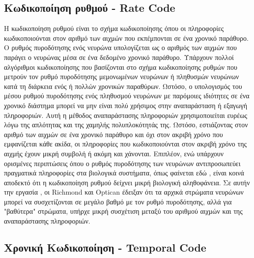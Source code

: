 \documentclass[12pt]{report}
\begin{document}
\subsection{Κωδικοποίηση ρυθμού - \textlatin{Rate Code}}

Η κωδικοποίηση ρυθμού είναι το σχήμα κωδικοποίησης όπου οι πληροφορίες κωδικοποιούνται στον αριθμό των αιχμών που εκπέμπονται σε ένα χρονικό παράθυρο. Ο ρυθμός πυροδότησης ενός νευρώνα υπολογίζεται ως ο αριθμός των αιχμών που παράγει ο νευρώνας μέσα σε ένα δεδομένο χρονικό παράθυρο. Υπάρχουν πολλοί αλγόριθμοι κωδικοποίησης που βασίζονται στο σχήμα κωδικοποίησης ρυθμών που μετρούν τον ρυθμό πυροδότησης μεμονωμένων νευρώνων ή πληθυσμών νευρώνων κατά τη διάρκεια ενός ή πολλών χρονικών παραθύρων. Ωστόσο, ο υπολογισμός του μέσου ρυθμού πυροδότησης ενός πληθυσμού νευρώνων με παρόμοιες ιδιότητες σε ένα χρονικό διάστημα μπορεί να μην είναι πολύ χρήσιμος στην αναπαράσταση ή εξαγωγή πληροφοριών. Αυτή η μέθοδος αναπαράστασης πληροφοριών χρησιμοποιείται ευρέως λόγω της απλότητας και της χαμηλής πολυπλοκότητάς της. Ωστόσο, εστιάζοντας στον αριθμό των αιχμών σε ένα χρονικό παράθυρο και όχι στον ακριβή χρόνο που εμφανίζεται κάθε ακίδα, οι πληροφορίες που κωδικοποιούνται στον ακριβή χρόνο της αιχμής έχουν μικρή συμβολή ή ακόμη και χάνονται. Επιπλέον, ενώ υπάρχουν ορισμένες περιπτώσεις όπου ο ρυθμός πυροδότησης των νευρώνων αντιπροσωπεύει πραγματικά πληροφορίες στα βιολογικά συστήματα, όπως φαίνεται εδώ \cite{Huxter2003}, είναι κοινά αποδεκτό ότι η κωδικοποίηση ρυθμού δείχνει μικρή βιολογική αληθοφάνεια. Σε αυτήν την εργασία \cite{Richmond1987}, οι \textlatin{Richmond} και \textlatin{Optican} έδειξαν ότι τα αρχικά στρώματα νευρώνων μπορεί να συσχετίζονται σε μεγάλο βαθμό με τον ρυθμό πυροδότησης, αλλά για "βαθύτερα" στρώματα, υπήρχε μικρή συσχέτιση μεταξύ του αριθμού αιχμών και της αναπαράστασης πληροφοριών.

\subsection{Χρονική Κωδικοποίηση - \textlatin{Temporal Code}}
\end{document}
